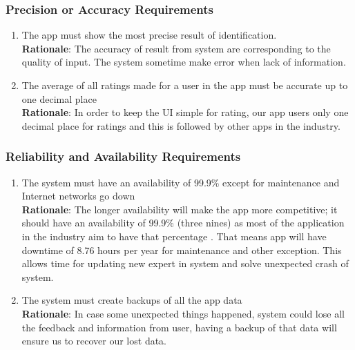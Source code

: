 \subsubsection{Precision or Accuracy Requirements}
\label{ssub:precision_or_accuracy_requirements}
\begin{enumerate}[{PR-PA}1. ]
	\item The app must show the most precise result of identification.
	\\ \textbf{Rationale}: The accuracy of result from system are corresponding to the quality of input. The system sometime make error when lack of information.
	\item The average of all ratings made for a user in the app must be accurate up to one decimal place
	\\ \textbf{Rationale}: In order to keep the UI simple for rating, our app users only one decimal place for ratings and this is followed by other apps in the industry. 
\end{enumerate}

\subsubsection{Reliability and Availability Requirements}
\label{ssub:reliability_and_availability_requirements}
\begin{enumerate}[{PR-RA}1. ]
	\item The system must have an availability of 99.9\% except for maintenance and Internet networks go down
	\\ \textbf{Rationale}: The longer availability will make the app more competitive; it should have an availability of 99.9\% (three nines) as most of the application in the industry aim to have that percentage \cite{1}. That means app will have downtime of 8.76 hours per year for maintenance and other exception. This allows time for updating new expert in system and solve unexpected crash of system.
	\item The system must create backups of all the app data
	\\ \textbf{Rationale}: In case some unexpected things happened, system could lose all the feedback and information from user, having a backup of that data will ensure us to recover our lost data.
\end{enumerate}


